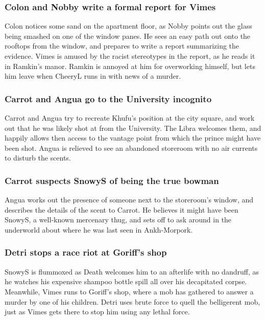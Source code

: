 \subsubsection{\Gls{Colon} and \Gls{Nobby} write a formal report for \Gls{Vimes}}
\Gls{Colon} notices some sand on the apartment floor, as \Gls{Nobby} points out the glass being
smashed on one of the window panes. He sees an easy path out onto the rooftops from the window, and
prepares to write a report summarizing the evidence. \Gls{Vimes} is amused by the racist stereotypes
in the report, as he reads it in \Gls{Ramkin}'s manor. \Gls{Ramkin} is annoyed at him for
overworking himself, but lets him leave when \Gls{CheeryL} runs in with news of a murder.

\subsubsection{\Gls{Carrot} and \Gls{Angua} go to the University incognito}
\Gls{Carrot} and \Gls{Angua} try to recreate \Gls{Khufu}'s position at the city square, and work
out that he was likely shot at from the University. The \Gls{Libra} welcomes them, and happily
allows then access to the vantage point from which the prince might have been shot. \Gls{Angua}
is relieved to see an abandoned storeroom with no air currents to disturb the scents.

\subsubsection{\Gls{Carrot} suspects \Gls{SnowyS} of being the true bowman}
\Gls{Angua} works out the presence of someone next to the storeroom's window, and describes the
details of the scent to \Gls{Carrot}. He believes it might have been \Gls{SnowyS}, a well-known
mercenary thug, and sets off to ask around in the underworld about where he was last seen in
Ankh-Morpork.

\subsubsection{\Gls{Detri} stops a race riot at \Gls{Goriff}'s shop}
\Gls{SnowyS} is flummoxed as \Gls{Death} welcomes him to an afterlife with no dandruff, as he
watches his expensive shampoo bottle spill all over his decapitated corpse. Meanwhile, \Gls{Vimes}
runs to \Gls{Goriff}'s shop, where a mob has gathered to answer a murder by one of his children.
\Gls{Detri} uses brute force to quell the belligerent mob, just as \Gls{Vimes} gets there to stop
him using any lethal force.

